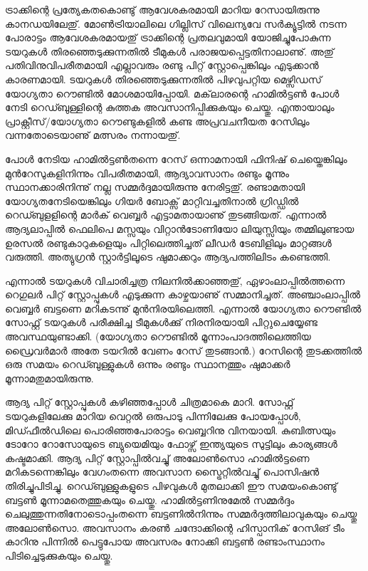 ﻿
\vskip 2pt

ട്രാക്കിന്റെ പ്രത്യേകതകൊണ്ടു് ആവേശകരമായി മാറിയ റേസായിരുന്നു കാനഡയിലേതു്. മോണ്‍ട്രിയാലിലെ ഗില്ലിസ് 
വിലെന്യവേ സര്‍ക്യൂട്ടില്‍ നടന്ന പോരാട്ടം ആവേശകരമായതു് ട്രാക്കിന്റെ പ്രതലവുമായി യോജിച്ചുപോകുന്ന ടയറുകള്‍ 
തിരഞ്ഞെടുക്കുന്നതില്‍ ടീമുകള്‍ പരാജയപ്പെട്ടതിനാലാണു്. അതു് പതിവിനുവിപരീതമായി എല്ലാവരും രണ്ടു പിറ്റ് 
സ്റ്റോപ്പെങ്കിലും എടുക്കാന്‍ കാരണമായി. ടയറുകള്‍ തിരഞ്ഞെടുക്കുന്നതില്‍ പിഴവുപറ്റിയ മെഴ്സിഡസ് യോഗ്യതാ റൌണ്ടില്‍ 
മോ​ശമായിപ്പോയി. മക്‌ലാരന്റെ ഹാമില്‍ട്ടണ്‍ പോള്‍ നേടി റെഡ്ബുള്ളിന്റെ കുത്തക അവസാനിപ്പിക്കുകയും ചെയ്തു. 
എന്തായാലും പ്രാക്റ്റീസ്/യോഗ്യതാ റൌണ്ടുകളില്‍ കണ്ട അപ്രവചനീയത റേസിലും വന്നതോടെയാണു് മത്സരം നന്നായതു്.

പോള്‍ നേടിയ ഹാമില്‍ട്ടണ്‍തന്നെ റേസ് ഒന്നാമനായി ഫിനിഷ് ചെയ്തെങ്കിലും മുന്‍റേസുകളിനിന്നും വിപരീതമായി,
ആദ്യാവസാനം രണ്ടും മൂന്നും സ്ഥാനക്കാരിനിന്നു് നല്ല സമ്മര്‍ദ്ദമായിരുന്നു നേരിട്ടതു്. രണ്ടാമതായി യോഗ്യതനേടിയെങ്കിലും
ഗിയര്‍ ബോക്സ് മാറ്റിവച്ചതിനാല്‍ ഗ്രിഡ്ഡില്‍ റെഡ്ബുളളിന്റെ മാര്‍ക് വെബ്ബര്‍ എട്ടാമതായാണു് തുടങ്ങിയത്. എന്നാല്‍ 
ആദ്യലാപ്പില്‍ ഫെലിപെ മസ്സയും വിറ്റാന്‍ടോണിയോ ലിയുസ്സിയും തമ്മിലുണ്ടായ ഉരസല്‍ രണ്ടുകാറുകളെയും 
പിറ്റിലെത്തിച്ചത് ലീഡര്‍ ടേബിളിലും മാറ്റങ്ങള്‍ വരുത്തി. അത്യുഗ്രന്‍ സ്റ്റാര്‍ട്ടിലൂടെ ഷുമാക്കറും ആദ്യപത്തിലിടം കണ്ടെത്തി.

എന്നാല്‍ ടയറുകള്‍ വിചാരിച്ചത്ര നിലനില്‍ക്കാഞ്ഞതു്, ഏഴാംലാപ്പില്‍ത്തന്നെ റെഗുലര്‍ പിറ്റ് സ്റ്റോപ്പുകള്‍ എടുക്കുന്ന 
കാഴ്ചയാണു് സമ്മാനിച്ചത്. അഞ്ചാംലാപ്പില്‍ വെബ്ബര്‍ ബട്ടണെ മറികടന്നു് മുന്‍നിരയിലെത്തി. എന്നാല്‍ യോഗ്യതാ 
റൌണ്ടില്‍ സോഫ്റ്റ് ടയറുകള്‍ പരീക്ഷിച്ച ടീമുകള്‍ക്കു് നിരനിരയായി പിറ്റുചെയ്യേണ്ട അവസ്ഥയുണ്ടാക്കി. (യോഗ്യതാ 
റൌണ്ടില്‍ മൂന്നാംപാദത്തിലെത്തിയ ഡ്രൈവര്‍മാര്‍ അതേ ടയറില്‍ വേണം റേസ് തുടങ്ങാന്‍.) റേസിന്റെ തുടക്കത്തില്‍ 
ഒരു സമയം റെഡ്ബുള്ളുകള്‍ ഒന്നും രണ്ടും സ്ഥാനത്തും ഷുമാക്കര്‍ മൂന്നാമതുമായിരുന്നു.

ആദ്യ പിറ്റ് സ്റ്റോപ്പുകള്‍ കഴിഞ്ഞപ്പോള്‍ ചിത്രമാകെ മാറി. സോഫ്റ്റ് ടയറുകളിലേക്കു മാറിയ വെറ്റല്‍ ഒരുപാടു പിന്നിലേക്കു 
പോയപ്പോള്‍, മിഡ്ഫീല്‍ഡിലെ പൊരിഞ്ഞപോരാട്ടം വെബ്ബറിനു വിനയായി. കുബിത്സയും ടോറോ റോസോയുടെ 
ബ്യുയെമിയും ഫോഴ്സ് ഇന്ത്യയുടെ സുട്ടിലും കാര്യങ്ങള്‍ കഷ്ടമാക്കി. ആദ്യ പിറ്റ് സ്റ്റോപ്പില്‍വച്ചു് അലോണ്‍സൊ ഹാമില്‍ട്ടണെ
മറികടന്നെങ്കിലും വേഗംതന്നെ അവസാന സ്ട്രൈറ്റില്‍വച്ചു് പൊസിഷന്‍ തിരിച്ചുപിടിച്ചു. റെഡ്ബുള്ളുകളുടെ പിഴവുകള്‍ 
മുതലാക്കി ഈ സമയംകൊണ്ടു് ബട്ടണ്‍ മൂന്നാമതെത്തുകയും ചെയ്തു. ഹാമില്‍ട്ടണിനുമേല്‍ സമ്മര്‍ദ്ദം 
ചെലുത്തുന്നതിനോടൊപ്പംതന്നെ ബട്ടണില്‍നിന്നും സമ്മര്‍ദ്ദത്തിലാവുകയും ചെയ്തു അലോണ്‍സൊ. അവസാനം 
കരണ്‍ ചന്ദോക്കിന്റെ ഹിസ്പാനിക് റേസിങ് ടീം കാറിനു പിന്നില്‍ പെട്ടുപോയ അവസരം നോക്കി ബട്ടണ്‍ രണ്ടാംസ്ഥാനം 
പിടിച്ചെടുക്കുകയും ചെയ്തു.

